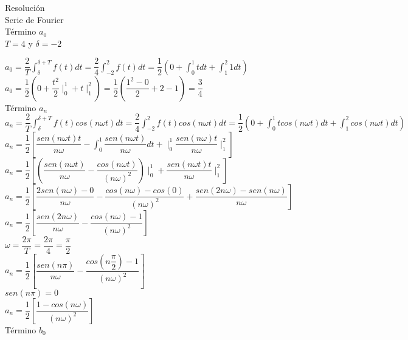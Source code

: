 \documentclass[10pt,a4paper]{article}
\begin{document}
\begin{center}
Resolución\\
Serie de Fourier\\
Término $a_0$\\
$T=4$ y $\delta = -2$
\end{center}

\begin{center}
$\displaystyle{a_0 = \dfrac{2}{T} \int_{\delta}^{\delta + T} f(t) dt = \dfrac{2}{4} \int_{-2}^{2} f(t) dt = \dfrac{1}{2} (0 + \int_{0}^{1} t dt + \int_{1}^{2} 1 dt)}$\\
$\displaystyle{a_0 = \dfrac{1}{2} (0 + \dfrac{t^2}{2} \mid^1_0  +t \mid^2_1 ) = \dfrac{1}{2} ( \dfrac{1^2 - 0}{2} +2-1)  = \dfrac{3}{4}}$\\
Término $a_n$\\
$\displaystyle{a_n = \dfrac{2}{T} \int_{\delta}^{\delta + T} f(t) cos (n \omega t)dt = \dfrac{2}{4} \int_{-2}^{2} f(t) cos (n \omega t)dt = \dfrac{1}{2} (0 + \int_{0}^{1} t cos (n \omega t) dt + \int_{1}^{2} cos (n \omega t) dt)}$\\
$\displaystyle{a_n = \dfrac{1}{2} [\dfrac{sen(n \omega t) t}{n \omega} - \int_{0}^{1} \dfrac{sen(n \omega t)}{n \omega} dt + \mid_{0}^{1} \dfrac{sen(n \omega) t}{n \omega} \mid_{1}^{2}]}$\\
$\displaystyle{a_n = \dfrac{1}{2} [(\dfrac{sen(n \omega t) }{n \omega} - \dfrac{cos(n \omega t)}{(n \omega)^2}   )\mid_{0}^{1} +  \dfrac{sen(n \omega t) t}{n \omega} \mid_{1}^{2}]}$\\
$\displaystyle{a_n = \dfrac{1}{2} [\dfrac{2 sen(n \omega) - 0 }{n \omega} - \dfrac{cos(n \omega) - cos(0)}{(n \omega)^2} + \dfrac{sen(2 n \omega ) -sen(n \omega) }{n \omega} ]}$\\
$\displaystyle{a_n = \dfrac{1}{2} [\dfrac{sen(2 n \omega)}{n \omega} - \dfrac{cos(n \omega) - 1}{(n \omega)^2}]}$\\
$\omega = \dfrac{2 \pi}{T} = \dfrac{2 \pi}{4} = \dfrac{\pi}{2} $\\
$\displaystyle{a_n = \dfrac{1}{2} [\dfrac{sen( n \pi)}{n \omega} - \dfrac{cos(n \dfrac{\pi}{2}) - 1}{(n \omega)^2}]}$\\
$sen (n \pi) = 0$\\
$\displaystyle{a_n = \dfrac{1}{2} [  \dfrac{1 - cos(n \omega)}{(n \omega)^2}]}$\\
Término $b_0$\\


\end{center}
\end{document}
